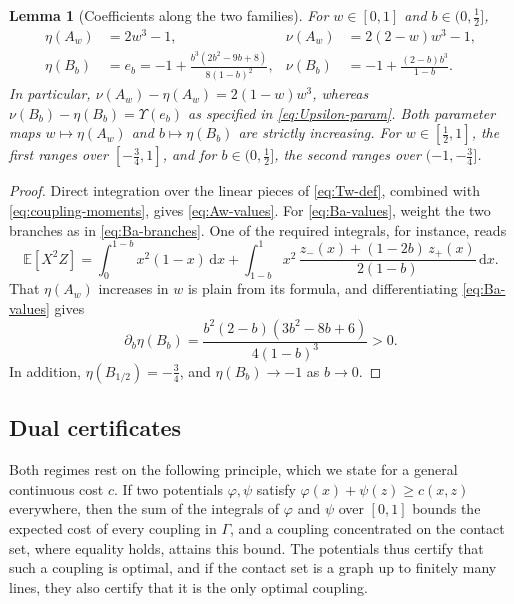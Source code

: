 \documentclass[11pt,a4paper]{article}
\newtheorem{lemma}[theorem]{Lemma}
\theoremstyle{remark}
\newcommand{\E}{\mathbb{E}}
\newcommand{\de}{\,\mathrm{d}}
\newcommand{\1}{\mathbf{1}}
\newcommand{\Gam}{\Gamma}
\begin{document}
\begin{lemma}[Coefficients along the two families]
\label{lem:eta-nu-values}
For $w\in[0,1]$ and $b\in(0,\frac12]$,
\begin{align}
  \eta(A_w)&=2w^3-1, &
  \nu(A_w)&=2(2-w)w^3-1,
  \label{eq:Aw-values}\\
  \eta(B_b)&=e_b=-1+\frac{b^3(2b^2-9b+8)}{8(1-b)^2}, &
  \nu(B_b)&=-1+\frac{(2-b)b^3}{1-b}.
  \label{eq:Ba-values}
\end{align}
In particular, $\nu(A_w)-\eta(A_w)=2(1-w)w^3$, whereas $\nu(B_b)-\eta(B_b)=\Upsilon(e_b)$ as specified in \eqref{eq:Upsilon-param}.
Both parameter maps $w\mapsto\eta(A_w)$ and $b\mapsto\eta(B_b)$ are strictly increasing.
For $w\in[\frac12,1]$, the first ranges over $[-\frac34,1]$, and for $b\in(0,\frac12]$, the second ranges over $(-1,-\frac34]$.
\end{lemma}

\begin{proof}
Direct integration over the linear pieces of \eqref{eq:Tw-def}, combined with \eqref{eq:coupling-moments}, gives \eqref{eq:Aw-values}.
For \eqref{eq:Ba-values}, weight the two branches as in \eqref{eq:Ba-branches}.
One of the required integrals, for instance, reads
\[
  \E[X^2Z]=\int_0^{1-b}x^2(1-x)\de x+\int_{1-b}^1x^2\,\frac{z_-(x)+(1-2b)\,z_+(x)}{2(1-b)}\de x.
\]
That $\eta(A_w)$ increases in $w$ is plain from its formula, and differentiating \eqref{eq:Ba-values} gives
\[
  \partial_b\eta(B_b)=\frac{b^2(2-b)(3b^2-8b+6)}{4(1-b)^3}>0.
\]
In addition, $\eta(B_{1/2})=-\frac34$, and $\eta(B_b)\to-1$ as $b\to0$.
\end{proof}

\subsection{Dual certificates}
\label{sec:eta-dual}

Both regimes rest on the following principle, which we state for a general continuous cost $c$.
If two potentials $\varphi,\psi$ satisfy $\varphi(x)+\psi(z)\ge c(x,z)$ everywhere, then the sum of the integrals of $\varphi$ and $\psi$ over $[0,1]$ bounds the expected cost of every coupling in $\Gam$, and a coupling concentrated on the contact set, where equality holds, attains this bound.
The potentials thus certify that such a coupling is optimal, and if the contact set is a graph up to finitely many lines, they also certify that it is the only optimal coupling.
\end{document}

